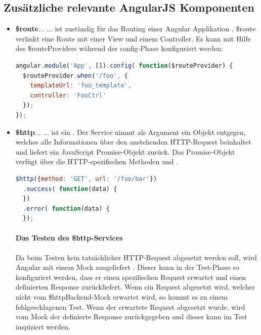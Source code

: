 \subsection{Zusätzliche relevante AngularJS Komponenten}
\begin{itemize}
  \item \textbf{\$route}...\linebreak
      ... ist zuständig für das Routing einer Angular Applikation \autocite[\$route]{Angular:APIRef}. \$route verlinkt eine Route mit einer View und einem Controller. Es kann mit Hilfe des \$routeProviders während der config-Phase konfiguriert werden:

      \begin{lstlisting}[language=JavaScript, caption=AngularJS - {\$}route]
angular.module('App', []).config( function($routeProvider) {
  $routeProvider.when('/foo', {
    templateUrl: 'foo_template',
    controller: 'FooCtrl'
  });
});
      \end{lstlisting}

  \item \textbf{\$http}...\linebreak
      ... ist ein  \autocite[\$http]{Angular:APIRef}. Der Service nimmt als Argument ein Objekt entgegen, welches alle Informationen über den anstehenden HTTP-Request beinhaltet und liefert ein JavaScript Promise-Objekt zurück. Das Promise-Objekt verfügt über die HTTP-spezifischen Methoden  und .

      \begin{lstlisting}[language=JavaScript, caption=AngularJS - {\$}http]
$http({method: 'GET', url: '/foo/bar'})
  .success( function(data) {
  })
  .error( function(data) {
  });
      \end{lstlisting}

      \paragraph{Das Testen des \$http-Services}
      Da beim Testen kein tatsächlicher HTTP-Request abgesetzt werden soll, wird Angular mit einem Mock  ausgeliefert \autocite[ngMock/service/\$httpBackend]{Angular:APIRef}. Dieser kann in der Test-Phase so konfiguriert werden, dass er einen spezifischen Request erwartet und einen definierten Response zurückliefert. Wenn ein Request abgesetzt wird, welcher nicht vom \$httpBackend-Mock erwartet wird, so kommt es zu einem fehlgeschlagenen Test. Wenn der erwartete Request abgesetzt wurde, wird vom Mock der definierte Response zurückgegeben und dieser kann im Test inspiziert werden.


\end{itemize}
